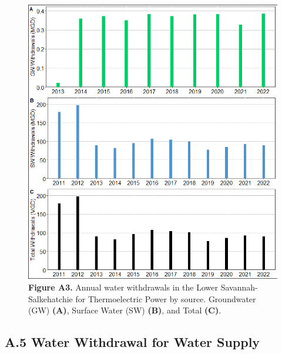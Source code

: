 \documentclass[
]{article}
\begin{document}
\begin{figure}[H]

{\centering \includegraphics{LSS_figures/trend-TH_bar-plot-1} 

}

\caption{\textbf{Figure A3.} Annual water withdrawals in the Lower Savannah-Salkehatchie for Thermoelectric Power by source. Groundwater (GW) \textbf{(A)}, Surface Water (SW) \textbf{(B)}, and Total \textbf {(C)}.}\label{fig:trend-TH_bar-plot}
\end{figure}

\hypertarget{a.5-water-withdrawal-for-water-supply}{%
\subsection{A.5 Water Withdrawal for Water
Supply}\label{a.5-water-withdrawal-for-water-supply}}
\end{document}

